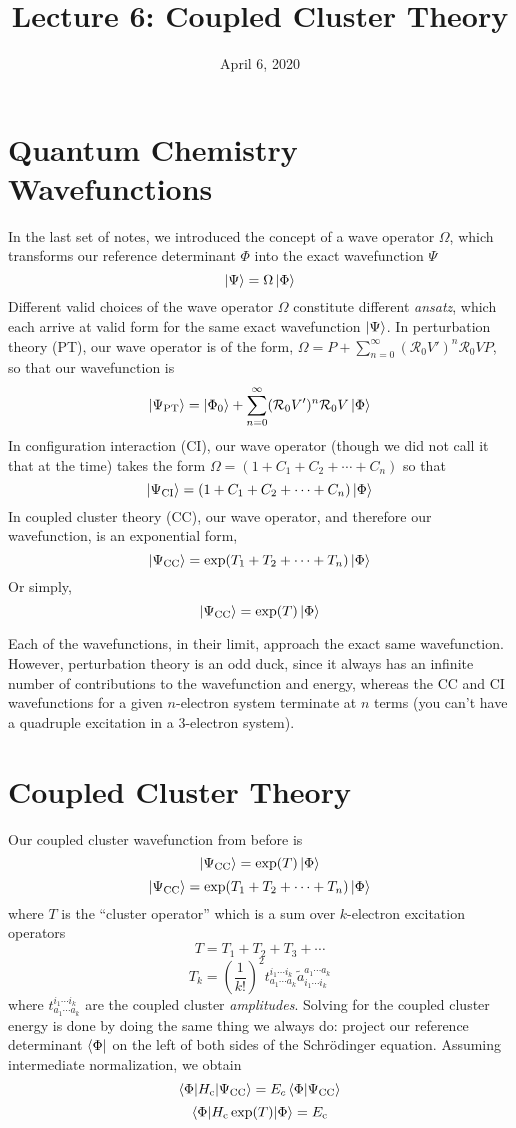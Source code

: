 \documentclass{article}
\title{Lecture 6: Coupled Cluster Theory}
\date{April 6, 2020}
\newcommand{\Rz}{\mathcal{R}_{0}}
\newcommand{\Ec}{E_{\mathrm{c}}}
\newcommand{\Hc}{H_{\mathrm{c}}}
\begin{document}
\maketitle
\noindent

\section{Quantum Chemistry Wavefunctions}
In the last set of notes, we introduced the concept of a wave operator $\Omega$, which transforms 
    our reference determinant $\Phi$ into the exact wavefunction $\Psi$
\[\ket{\Psi} = \Omega \ket{\Phi} \]
Different valid choices of the wave operator  $\Omega$ constitute different \textit{ansatz},  
    which each arrive at valid form for the same exact wavefunction $\ket{\Psi}$.
In perturbation theory (PT), our wave operator is of the form,
$\Omega = P + \sum_{n=0}^{\infty} (\Rz V')^n \Rz V P$, so that our wavefunction is
\[\ket{\Psi_{\mathrm{PT}}} =  \ket{\Phi_0} + \sum_{n=0}^{\infty} (\Rz V')^n \Rz V \ket{\Phi} \]
In configuration interaction (CI), our wave operator (though we did not call it that at the time)
takes the form $\Omega = (1 + C_1 + C_2 + \cdots + C_n)$ so that 
\[\ket{\Psi_{\mathrm{CI}}} = (1 + C_1 + C_2 + \cdots + C_n) \ket{\Phi} \]
In coupled cluster theory (CC), our wave operator, and therefore our wavefunction, 
is an exponential form,
\[\ket{\Psi_{\mathrm{CC}}} = \exp(T_1 + T_2 + \cdots + T_n) \ket{\Phi} \]
Or simply, 
\[\ket{\Psi_{\mathrm{CC}}} = \exp(T) \ket{\Phi} \]

Each of the wavefunctions, in their limit, approach the exact same wavefunction.
However, perturbation theory is an odd duck, since it always has an infinite number of
    contributions to the wavefunction and energy, 
    whereas the CC and CI wavefunctions for a given $n$-electron system 
    terminate at $n$ terms (you can't have a quadruple excitation in a 3-electron system). 

\section{Coupled Cluster Theory}
Our coupled cluster wavefunction from before is 
\[\ket{\Psi_{\mathrm{CC}}} = \exp(T) \ket{\Phi} \]
\[\ket{\Psi_{\mathrm{CC}}} = \exp(T_1 + T_2 + \cdots + T_n) \ket{\Phi} \]
where $T$ is the ``cluster operator'' which is a sum over
$k$-electron excitation operators
\[T = T_1 + T_2 + T_3 + \cdots \]
\[T_k = \left(\frac{1}{k!}\right)^2 t_{a_1 \cdots a_k}^{i_1 \cdots i_k } \tilde{a}_{i_1 \cdots i_k}^{a_1 \cdots a_k } \]
where $t_{a_1 \cdots a_k}^{i_1 \cdots i_k }$ are the coupled cluster \textit{amplitudes}.
Solving for the coupled cluster energy is done by doing the same thing we always do:
project our reference determinant $\bra{\Phi}$ on the left of both sides 
of the Schr{\"o}dinger equation.
Assuming intermediate normalization, we obtain
\[\braket{\Phi | \Hc | \Psi_{\mathrm{CC}}} = E_c \braket{\Phi|\Psi_{\mathrm{CC}}} \]
\[\braket{\Phi | \Hc \exp(T) | \Phi} = \Ec \]
\end{document}

